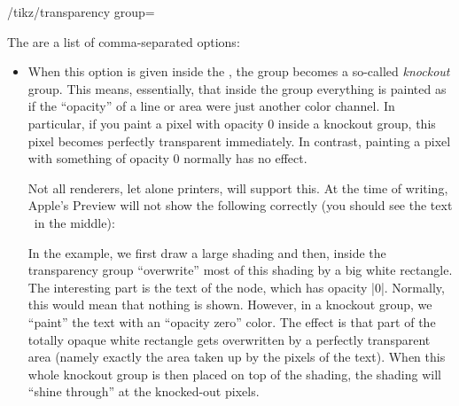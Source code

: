 \begin{key}{/tikz/transparency group=}
\begin{codeexample}[preamble={\usetikzlibrary{patterns,shapes.symbols}},svg]
\end{codeexample}

    The  are a list of comma-separated options:
    \begin{itemize}
        \item {} When this option is given inside the
            , the group becomes a so-called \emph{knockout}
            group. This means, essentially, that inside the group everything is
            painted as if the ``opacity'' of a line or area were just another
            color channel. In particular, if you paint a pixel with opacity $0$
            inside a knockout group, this pixel becomes perfectly transparent
            immediately. In contrast, painting a pixel with something of
            opacity $0$ normally has no effect.

            Not all renderers, let alone printers, will support this. At the
            time of writing, Apple's Preview will not show the following
            correctly (you should see the text \tikzname\ in the middle):
\begin{codeexample}[]
\end{codeexample}
            In the example, we first draw a large shading and then, inside the
            transparency group ``overwrite'' most of this shading by a big
            white rectangle. The interesting part is the text of the node,
            which has opacity |0|. Normally, this would mean that nothing is
            shown. However, in a knockout group, we ``paint'' the text with an
            ``opacity zero'' color. The effect is that part of the totally
            opaque white rectangle gets overwritten by a perfectly transparent
            area (namely exactly the area taken up by the pixels of the text).
            When this whole knockout group is then placed on top of the
            shading, the shading will ``shine through'' at the knocked-out
            pixels.


\end{itemize}
\end{key}
